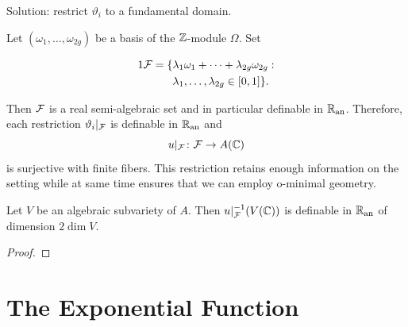 \documentclass{beamer}
\begin{document}
\begin{frame}
  Solution: restrict $\vartheta_i$ to a
  \alert{fundamental domain}.
  
  Let $(\omega_1,\ldots,\omega_{2g})$ be a basis of the ${\mathbb{Z}}$-module
  $\Omega$. Set
  \begin{minipage}{0.6\linewidth}
    \begin{alignat*}1
      \cF = \{&\lambda_1\omega_1+\cdots+\lambda_{2g}\omega_{2g} :
      \\ &      \lambda_1,\ldots,\lambda_{2g}\in [0,1]\}.
    \end{alignat*}  
  \end{minipage}  \begin{minipage}{0.3\linewidth}
  \end{minipage}

  
  Then ${\mathcal F}$ is a real semi-algebraic set and in particular definable
  in ${{\mathbb{R}}_{\mathrm{an}}}$. 
  Therefore, each \alert{restriction} $\vartheta_i|_{{\mathcal F}}$ is
  definable in ${{\mathbb{R}}_{\mathrm{an}}}$ and
  \begin{equation*}
    u|_{{\mathcal F}} \colon {\mathcal F}\rightarrow A({\mathbb{C}})
  \end{equation*}
  is surjective  with finite fibers.
  This restriction retains enough information on the setting while at
  same time ensures that we can employ o-minimal geometry.
\end{frame}

\begin{frame}
  \begin{lemma}
    Let $V$ be an algebraic subvariety of $A$.
    Then $u|_{{\mathcal F}}^{-1}(V({\mathbb{C}}))$ is definable in ${{\mathbb{R}}_{\mathrm{an}}}$
    of dimension $2\dim V$. 
  \end{lemma}
  \begin{proof}
    \vspace{5cm}
  \end{proof}
\end{frame}

\section{The Exponential Function}
\end{document}
